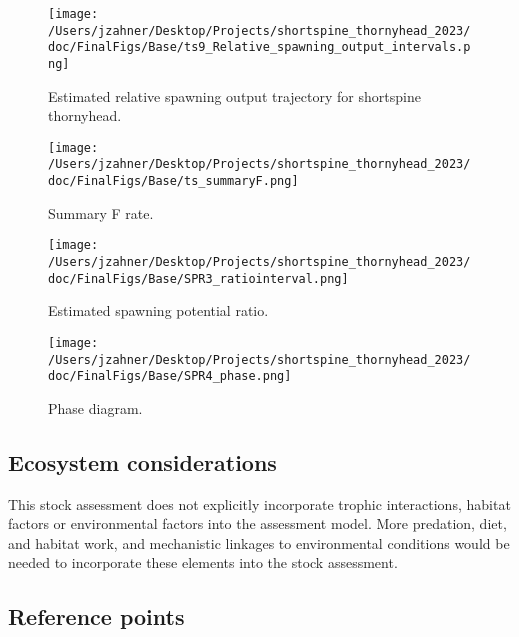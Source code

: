 \documentclass[11pt,
  english,
  letterpaper,
]{article}
\begin{document}
\begin{figure}
\centering
\texttt{[image: /Users/jzahner/Desktop/Projects/shortspine\_thornyhead\_2023/doc/FinalFigs/Base/ts9\_Relative\_spawning\_output\_intervals.png]}
\caption{Estimated relative spawning output trajectory for shortspine thornyhead.\label{fig:rel_ssb_trajectoryES}}
\end{figure}

\begin{figure}
\centering
\texttt{[image: /Users/jzahner/Desktop/Projects/shortspine\_thornyhead\_2023/doc/FinalFigs/Base/ts\_summaryF.png]}
\caption{Summary F rate.\label{fig:summary_fES}}
\end{figure}

\begin{figure}
\centering
\texttt{[image: /Users/jzahner/Desktop/Projects/shortspine\_thornyhead\_2023/doc/FinalFigs/Base/SPR3\_ratiointerval.png]}
\caption{Estimated spawning potential ratio.\label{fig:spr_trajectoryES}}
\end{figure}

\begin{figure}
\centering
\texttt{[image: /Users/jzahner/Desktop/Projects/shortspine\_thornyhead\_2023/doc/FinalFigs/Base/SPR4\_phase.png]}
\caption{Phase diagram.\label{fig:phase_diagramES}}
\end{figure}

\hypertarget{ecosystem-considerations}{%
\subsection*{Ecosystem considerations}\label{ecosystem-considerations}}

This stock assessment does not explicitly incorporate trophic interactions, habitat factors or environmental factors into the assessment model. More predation, diet, and habitat work, and mechanistic linkages to environmental conditions would be needed to incorporate these elements into the stock assessment.

\hypertarget{reference-points}{%
\subsection*{Reference points}\label{reference-points}}
\end{document}
